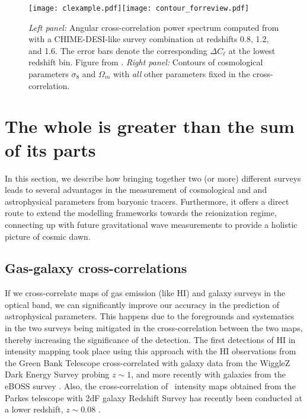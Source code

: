 


\begin{figure}
\centering
\texttt{[image: clexample.pdf]}\texttt{[image: contour\_forreview.pdf]}
\caption{\textit{Left panel:} Angular cross-correlation power spectrum computed from  with a CHIME-DESI-like survey combination at redshifts 0.8, 1.2, and 1.6. The error bars denote the corresponding $\Delta C_{\ell}$ at the lowest redshift bin. Figure from \cite{hparaa2019}. \textit{Right panel:} Contours of cosmological parameters $\sigma_8$ and $\Omega_m$ with \textit{all} other parameters fixed in the cross-correlation.}
\label{fig:contour1}
\end{figure} 





\section{The whole is greater than the sum of its parts}
\label{sec:crosscorrelations}

In this section, we describe how bringing together two (or more) different surveys leads to several advantages in the measurement of cosmological and and astrophysical parameters from baryonic tracers. Furthermore, it offers a direct route to extend the modelling frameworks towards the reionization regime, connecting up with future gravitational wave measurements to provide a holistic picture of cosmic dawn.   

\subsection{Gas-galaxy cross-correlations}

If we cross-correlate maps of gas emission (like HI) and galaxy surveys in the optical band, we can significantly improve our accuracy in the prediction of astrophysical parameters. This happens due to the foregrounds and systematics in the two surveys being mitigated in the cross-correlation between the two maps, thereby increasing the significance of the detection. The first detections of HI in intensity mapping took place using this approach \cite{Chang:2010jp, switzer13, masui13} with the HI observations from the Green Bank Telescope cross-correlated with galaxy data from the WiggleZ Dark Energy Survey probing $z \sim 1$, and more recently with galaxies from the eBOSS survey \cite{wolz2021}. Also, the cross-correlation of \HI\ intensity maps obtained from the Parkes telescope with 2dF galaxy Redshift Survey has recently been conducted at a lower redshift, $z \sim 0.08$ \cite{anderson2018}. 


